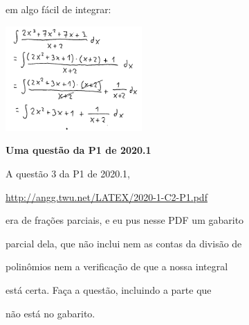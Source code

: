 \documentclass[oneside,12pt]{article}
\begin{document}
em algo fácil de integrar:

\msk

\includegraphics[height=4cm]{2020-1-C2/20201119_C2_div_com_resto_4.pdf}


\newpage


{\bf Uma questão da P1 de 2020.1}

A questão 3 da P1 de 2020.1,

\ssk

\url{http://angg.twu.net/LATEX/2020-1-C2-P1.pdf}

\ssk

era de frações parciais, e eu pus nesse PDF um gabarito

parcial dela, que não inclui nem as contas da divisão de

polinômios nem a verificação de que a nossa integral

está certa. Faça a questão, incluindo a parte que

não está no gabarito.



\end{document}
